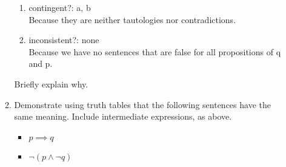 \documentclass{article}
\begin{document}
\begin{enumerate}[\bf I.]
\begin{enumerate}[1.]
\begin{enumerate}
                \item contingent?: a, b \\
                Because they are neither tautologies nor contradictions.
                \item inconsistent?: none \\
                Because we have no sentences that are false for all propositions of q and p.
            \end{enumerate}
            Briefly explain why.
            \item Demonstrate using truth tables that the following sentences have the same meaning. Include intermediate expressions, as above.

            \begin{itemize}
                \item $p \implies q$
                \item $\neg (p \land \neg q)$
            \end{itemize}
        \end{enumerate}


\end{enumerate}
\end{document}
